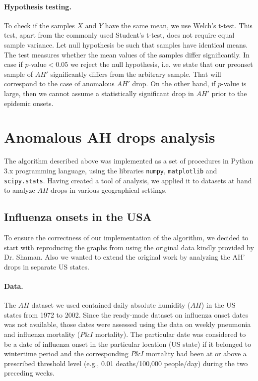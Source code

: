 \documentclass[procedia]{easychair}
\begin{document}
\paragraph{Hypothesis testing.}
To check if the samples $X$ and $Y$ have the same mean, we use Welch's t-test. This test, apart from the commonly used Student's t-test, does not require equal sample variance. Let null hypothesis be such that samples have identical means. The test measures whether the mean values of the samples differ significantly. In case if $p$-value$<0.05$ we reject the null hypothesis, i.e. we state that our preonset sample of $AH'$ significantly differs from the arbitrary sample. That will correspond to the case of anomalous $AH'$ drop. On the other hand, if $p$-value is large, then we cannot assume a statistically significant drop in $AH'$ prior to the epidemic onsets.


\section{Anomalous AH drops analysis}

The algorithm described above was implemented as a set of procedures in Python 3.x programming language, using the libraries \texttt{numpy}, \texttt{matplotlib} and \texttt{scipy.stats}. Having created a tool of analysis, we applied it to datasets at hand to analyze $AH$ drops in various geographical settings.

\subsection{Influenza onsets in the USA} \label{sect:usa}

To ensure the correctness of our implementation of the algorithm, we decided to start with reproducing the graphs from \cite{shaman2010absolute} using the original data kindly provided by Dr. Shaman. Also we wanted to extend the original work by analyzing the AH' drops in separate US states.

\paragraph{Data.}

The $AH$ dataset we used contained daily absolute humidity ($AH$) in the US states from 1972 to 2002. Since the ready-made dataset on influenza onset dates was not available, those dates were assessed using the data on weekly pneumonia and influenza mortality ($P\&I$ mortality). The particular date was considered to be a date of influenza onset in the particular location (US state) if it belonged to wintertime period and the corresponding $P\&I$ mortality had been at or above a prescribed threshold level (e.g., 0.01 deaths/100,000 people/day) during the two preceding weeks. 
\end{document}
